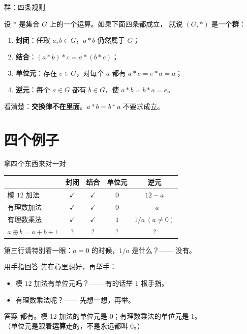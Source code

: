 \documentclass[10pt]{beamer}
\begin{document}
\begin{frame}{群：四条规则}
  \begin{definition}[群]
    设 \(*\) 是集合 \(G\) 上的一个运算。如果下面四条都成立，
    就说 \((G,*)\) 是一个\textbf{群}：
    \begin{enumerate}
      \item \textbf{封闭}：任取 \(a,b\in G\)，\(a*b\) 仍然属于 \(G\)；
      \item \textbf{结合}：\((a*b)*c=a*(b*c)\)；
      \item \textbf{单位元}：存在 \(e\in G\)，对每个 \(a\) 都有 \(a*e=e*a=a\)；
      \item \textbf{逆元}：每个 \(a\in G\) 都有 \(b\in G\)，使 \(a*b=b*a=e\)。
    \end{enumerate}
  \end{definition}
  \pause
  \begin{att}
    看清楚：\textbf{交换律不在里面}。\(a*b=b*a\) 不要求成立。
  \end{att}
\end{frame}

\section{四个例子}

\begin{frame}{拿四个东西来对一对}
  \begin{center}
  \begin{tabular}{@{}lcccc@{}}
    \toprule
     & 封闭 & 结合 & 单位元 & 逆元 \\
    \midrule
    模 \(12\) 加法 & \(\checkmark\) & \(\checkmark\) & \(0\) & \(12-a\) \\
    有理数加法 & \(\checkmark\) & \(\checkmark\) & \(0\) & \(-a\) \\
    有理数乘法 & \(\checkmark\) & \(\checkmark\) & \(1\) & \(1/a\ (a\neq0)\) \\
    \(a\oplus b=a+b+1\) & ? & ? & ? & ? \\
    \bottomrule
  \end{tabular}
  \end{center}
  \pause
  \begin{att}
    第三行请特别看一眼：\(a=0\) 的时候，\(1/a\) 是什么？—— 没有。
  \end{att}
\end{frame}

\begin{frame}{用手指回答}
  先在心里想好，再举手：
  \begin{itemize}
    \item 模 \(12\) 加法有单位元吗？—— 有的话举 \(1\) 根手指。
    \item 有理数乘法呢？—— 先想一想，再举。
  \end{itemize}
  \pause
  \begin{block}{答案}
    都有。模 \(12\) 加法的单位元是 \(0\)；有理数乘法的单位元是 \(1\)。\\
    （单位元是跟着\textbf{运算}走的，不是永远都叫 \(0\)。）
  \end{block}
\end{frame}
\end{document}
